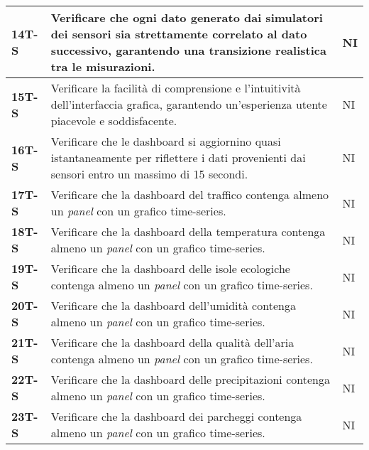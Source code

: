 \begin{longtable}{|>{\raggedright\arraybackslash}m{}|>{\raggedright\arraybackslash}m{}|>{\raggedright\arraybackslash}m{}|}
	\hline
	\textbf{14T-S}  & Verificare che ogni dato generato dai simulatori dei sensori sia strettamente correlato al dato successivo, garantendo una transizione realistica tra le misurazioni.                            & NI             \\
	\hline
	\textbf{15T-S}  & Verificare la facilità di comprensione e l'intuitività dell'interfaccia grafica, garantendo un'esperienza utente piacevole e soddisfacente.                                                      & NI             \\
	\hline
	\textbf{16T-S}  & Verificare che le dashboard si aggiornino quasi istantaneamente per riflettere i dati provenienti dai sensori entro un massimo di 15 secondi.                                                    & NI             \\
	\hline
	\textbf{17T-S}  & Verificare che la dashboard del traffico contenga almeno un \textit{panel} con un grafico time-series.                                                                                           & NI             \\
	\hline
	\textbf{18T-S}  & Verificare che la dashboard della temperatura contenga almeno un \textit{panel} con un grafico time-series.                                                                                      & NI             \\
	\hline
	\textbf{19T-S}  & Verificare che la dashboard delle isole ecologiche contenga almeno un \textit{panel} con un grafico time-series.                                                                                 & NI             \\
	\hline
	\textbf{20T-S}  & Verificare che la dashboard dell'umidità contenga almeno un \textit{panel} con un grafico time-series.                                                                                           & NI             \\
	\hline
	\textbf{21T-S}  & Verificare che la dashboard della qualità dell'aria contenga almeno un \textit{panel} con un grafico time-series.                                                                                & NI             \\
	\hline
	\textbf{22T-S}  & Verificare che la dashboard delle precipitazioni contenga almeno un \textit{panel} con un grafico time-series.                                                                                   & NI             \\
	\hline
	\textbf{23T-S}  & Verificare che la dashboard dei parcheggi contenga almeno un \textit{panel} con un grafico time-series.                                                                                          & NI             \\

\end{longtable}
